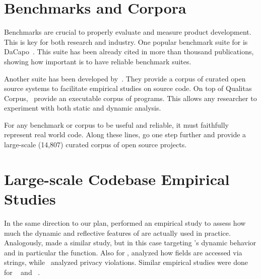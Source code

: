 
\section{Benchmarks and Corpora}
\label{sec:lr:benchmarks}

Benchmarks are crucial to properly evaluate and measure product development.
This is key for both research and industry.
One popular benchmark suite for \java{} is DaCapo~\cite{blackburnDaCapoBenchmarksJava2006}.
This suite has been already cited in more than thousand publications, showing how important is to have reliable benchmark suites.

Another suite has been developed by~\cite{temperoQualitasCorpusCurated2010}.
They provide a corpus of curated open source systems to facilitate empirical studies on source code.
On top of Qualitas Corpus,~\cite{dietrichXCorpusExecutableCorpus2017} provide an executable corpus of \java{} programs.
This allows any researcher to experiment with both static and dynamic analysis.

For any benchmark or corpus to be useful and reliable, it must faithfully represent real world code.
Along these lines, \cite{allamanisMiningSourceCode2013} go one step further and provide a large-scale (14,807) curated corpus of open source \java{} projects.

\section{Large-scale Codebase Empirical Studies}
\label{sec:lr:largescale}

In the same direction to our plan, \cite{callauHowWhyDevelopers2013} performed an empirical study to assess how much the dynamic and reflective features of \smalltalk{} are actually used in practice.
Analogously, \cite{richardsAnalysisDynamicBehavior2010,richardsEvalThatMen2011} made a similar study, but in this case targeting \javascript{}'s dynamic behavior and in particular the  function. 
Also for \javascript{}, \cite{madsenStringAnalysisDynamic2014} analyzed how fields are accessed via strings, while~\cite{jangEmpiricalStudyPrivacyviolating2010} analyzed privacy violations. 
Similar empirical studies were done for \php{}~\cite{hillsEmpiricalStudyPHP2013,dahseExperienceReportEmpirical2015,doyleEmpiricalStudyEvolution2011} and \swift{}~\cite{reboucasEmpiricalStudyUsage2016}.  

